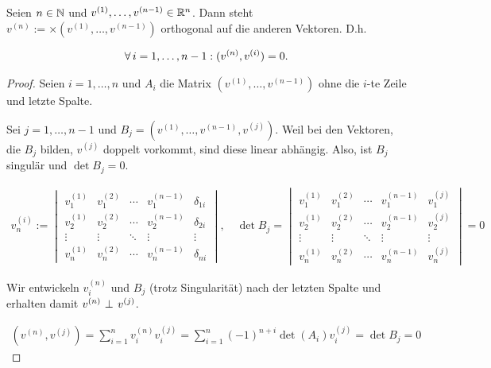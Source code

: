 \begin{theorem*}

Seien $n \in \mathbb{N}$ und $v^{(1)}, \ldots, v^{(n-1)} \in \mathbb{R}^n$.
Dann steht $v^{(n)} := \times(v^{(1)}, \ldots, v^{(n-1)})$ orthogonal auf die anderen Vektoren.
D.h.

\begin{align*}
  \forall \, i = 1, \ldots, n-1:
  (v^{(n)}, v^{(i)}) = 0.
\end{align*}

\end{theorem*}

\begin{proof}

Seien $i = 1, \ldots, n$ und $A_i$ die Matrix $(v^{(1)}, \ldots, v^{(n-1)})$ ohne die $i$-te Zeile und letzte Spalte.

Sei $j = 1, \ldots, n-1$ und $B_j = (v^{(1)}, \ldots, v^{(n-1)}, v^{(j)})$.
Weil bei den Vektoren, die $B_j$ bilden, $v^{(j)}$ doppelt vorkommt, sind diese linear abhängig.
Also, ist $B_j$ singulär und $\det{B_j} = 0$.

\begin{align*}
  v^{(i)}_n
  :=
  \begin{vmatrix}
    v^{(1)}_1 & v^{(2)}_1 & \cdots & v^{(n-1)}_1 & \delta_{1 i} \\
    v^{(1)}_2 & v^{(2)}_2 & \cdots & v^{(n-1)}_2 & \delta_{2 i} \\
    \vdots    & \vdots    & \ddots & \vdots      & \vdots \\
    v^{(1)}_n & v^{(2)}_n & \cdots & v^{(n-1)}_n & \delta_{n i}
  \end{vmatrix},
  \quad
  \det{B_j}
  =
  \begin{vmatrix}
    v^{(1)}_1 & v^{(2)}_1 & \cdots & v^{(n-1)}_1 & v^{(j)}_1 \\
    v^{(1)}_2 & v^{(2)}_2 & \cdots & v^{(n-1)}_2 & v^{(j)}_2 \\
    \vdots    & \vdots    & \ddots & \vdots      & \vdots \\
    v^{(1)}_n & v^{(2)}_n & \cdots & v^{(n-1)}_n & v^{(j)}_n
  \end{vmatrix}
  = 0
\end{align*}

Wir entwickeln $v^{(n)}_i$ und $B_j$ (trotz Singularität) nach der letzten Spalte und erhalten damit $v^{(n)} ~\bot_{}~ v^{(j)}$.

\begin{align*}
  (v^{(n)}, v^{(j)})
  =
  \sum_{i=1}^n
  v^{(n)}_i
  v^{(j)}_i
  =
  \sum_{i=1}^n
  (-1)^{n + i} \det{(A_i)}
  v^{(j)}_i
  =
  \det{B_j} = 0
\end{align*}

\end{proof}
